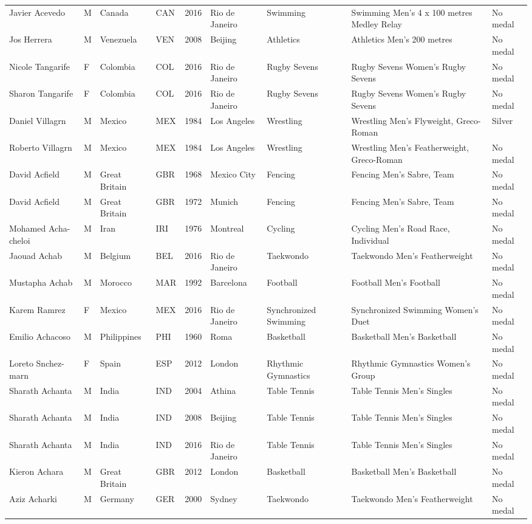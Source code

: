 \documentclass{article}%
\begin{document}
\begin{longtable}{l l l l l l l l l}
Javier Acevedo&M&Canada&CAN&2016&Rio de Janeiro&Swimming&Swimming Men's 4 x 100 metres Medley Relay&No medal\\%
Jos Herrera&M&Venezuela&VEN&2008&Beijing&Athletics&Athletics Men's 200 metres&No medal\\%
Nicole Tangarife&F&Colombia&COL&2016&Rio de Janeiro&Rugby Sevens&Rugby Sevens Women's Rugby Sevens&No medal\\%
Sharon Tangarife&F&Colombia&COL&2016&Rio de Janeiro&Rugby Sevens&Rugby Sevens Women's Rugby Sevens&No medal\\%
Daniel Villagrn&M&Mexico&MEX&1984&Los Angeles&Wrestling&Wrestling Men's Flyweight, Greco{-}Roman&Silver\\%
Roberto Villagrn&M&Mexico&MEX&1984&Los Angeles&Wrestling&Wrestling Men's Featherweight, Greco{-}Roman&No medal\\%
David Acfield&M&Great Britain&GBR&1968&Mexico City&Fencing&Fencing Men's Sabre, Team&No medal\\%
David Acfield&M&Great Britain&GBR&1972&Munich&Fencing&Fencing Men's Sabre, Team&No medal\\%
Mohamed Acha{-}cheloi&M&Iran&IRI&1976&Montreal&Cycling&Cycling Men's Road Race, Individual&No medal\\%
Jaouad Achab&M&Belgium&BEL&2016&Rio de Janeiro&Taekwondo&Taekwondo Men's Featherweight&No medal\\%
Mustapha Achab&M&Morocco&MAR&1992&Barcelona&Football&Football Men's Football&No medal\\%
Karem Ramrez&F&Mexico&MEX&2016&Rio de Janeiro&Synchronized Swimming&Synchronized Swimming Women's Duet&No medal\\%
Emilio Achacoso&M&Philippines&PHI&1960&Roma&Basketball&Basketball Men's Basketball&No medal\\%
Loreto Snchez{-}marn&F&Spain&ESP&2012&London&Rhythmic Gymnastics&Rhythmic Gymnastics Women's Group&No medal\\%
Sharath Achanta&M&India&IND&2004&Athina&Table Tennis&Table Tennis Men's Singles&No medal\\%
Sharath Achanta&M&India&IND&2008&Beijing&Table Tennis&Table Tennis Men's Singles&No medal\\%
Sharath Achanta&M&India&IND&2016&Rio de Janeiro&Table Tennis&Table Tennis Men's Singles&No medal\\%
Kieron Achara&M&Great Britain&GBR&2012&London&Basketball&Basketball Men's Basketball&No medal\\%
Aziz Acharki&M&Germany&GER&2000&Sydney&Taekwondo&Taekwondo Men's Featherweight&No medal\\%

\end{longtable}
\end{document}
